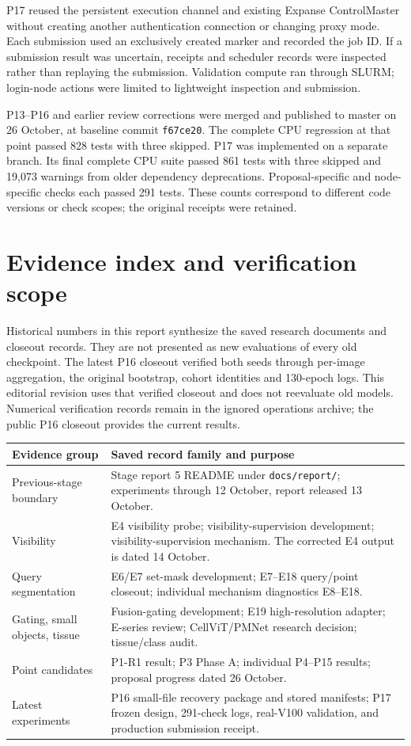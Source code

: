 \documentclass[11pt,a4paper]{article}
\begin{document}
P17 reused the persistent execution channel and existing Expanse ControlMaster without creating another authentication connection or changing proxy mode. Each submission used an exclusively created marker and recorded the job ID. If a submission result was uncertain, receipts and scheduler records were inspected rather than replaying the submission. Validation compute ran through SLURM; login-node actions were limited to lightweight inspection and submission.

P13--P16 and earlier review corrections were merged and published to master on 26 October, at baseline commit \texttt{f67ce20}. The complete CPU regression at that point passed 828 tests with three skipped. P17 was implemented on a separate branch. Its final complete CPU suite passed 861 tests with three skipped and 19,073 warnings from older dependency deprecations. Proposal-specific and node-specific checks each passed 291 tests. These counts correspond to different code versions or check scopes; the original receipts were retained.


\section{Evidence index and verification scope}

Historical numbers in this report synthesize the saved research documents and closeout records. They are not presented as new evaluations of every old checkpoint. The latest P16 closeout verified both seeds through per-image aggregation, the original bootstrap, cohort identities and 130-epoch logs. This editorial revision uses that verified closeout and does not reevaluate old models. Numerical verification records remain in the ignored operations archive; the public P16 closeout provides the current results.

\begin{longtable}{p{31mm}p{121mm}}
\toprule Evidence group & Saved record family and purpose\\\midrule\endhead
Previous-stage boundary & Stage report 5 README under \texttt{docs/report/}; experiments through 12 October, report released 13 October.\\
Visibility & E4 visibility probe; visibility-supervision development; visibility-supervision mechanism. The corrected E4 output is dated 14 October.\\
Query segmentation & E6/E7 set-mask development; E7--E18 query/point closeout; individual mechanism diagnostics E8--E18.\\
Gating, small objects, tissue & Fusion-gating development; E19 high-resolution adapter; E-series review; CellViT/PMNet research decision; tissue/class audit.\\
Point candidates & P1-R1 result; P3 Phase A; individual P4--P15 results; proposal progress dated 26 October.\\
Latest experiments & P16 small-file recovery package and stored manifests; P17 frozen design, 291-check logs, real-V100 validation, and production submission receipt.\\\bottomrule
\end{longtable}
\end{document}
